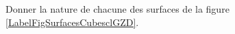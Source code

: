 
\begin{exercice}\label{exoSeconde-0088}


Donner la nature de chacune des surfaces de la figure \ref{LabelFigSurfacesCubesclGZD}. %
\newcommand{\CaptionFigSurfacesCubesclGZD}{Quelle type de surfaces sont dessinées ?}


\end{exercice}
